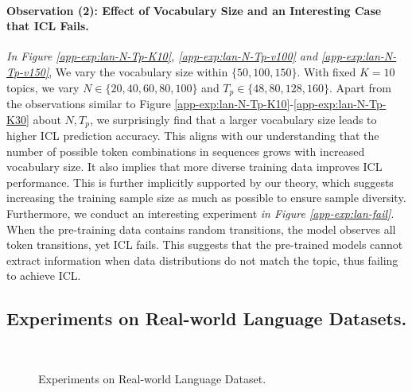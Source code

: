 \paragraph{Observation (2): Effect of Vocabulary Size and an Interesting Case that ICL Fails.} \textit{In Figure \ref{app-exp:lan-N-Tp-K10}, \ref{app-exp:lan-N-Tp-v100} and \ref{app-exp:lan-N-Tp-v150}}, We vary the vocabulary size within $\{50, 100, 150\}$. With fixed $K=10$ topics, we vary $N \in \{20,40,60,80,100\}$ and $T_p \in \{48, 80, 128, 160\}$. Apart from the observations similar to Figure \ref{app-exp:lan-N-Tp-K10}-\ref{app-exp:lan-N-Tp-K30} about $N, T_p$, we surprisingly find that a larger vocabulary size leads to higher ICL prediction accuracy. This aligns with our understanding that the number of possible token combinations in sequences grows with increased vocabulary size. It also implies that more diverse training data improves ICL performance. This is further implicitly supported by our theory, which suggests increasing the training sample size as much as possible to ensure sample diversity. Furthermore, we conduct an interesting experiment \textit{in Figure \ref{app-exp:lan-fail}}. When the pre-training data contains random transitions, the model observes all token transitions, yet ICL fails. This suggests that the pre-trained models cannot extract information when data distributions do not match the topic, thus failing to achieve ICL.

\subsection{Experiments on Real-world Language Datasets.}\label{app:language}
\begin{figure*}
    \centering
    \vspace{-1em}
    \hspace{-1em}
    \hspace{-1em}
    \\
    \vspace{-1em}
    \hspace{-0.7em}
    \hspace{-1em}
    \hspace{-1em}
    \caption{Experiments on Real-world Language Dataset.}
    \label{fig:exp-real-language}
\end{figure*} 

